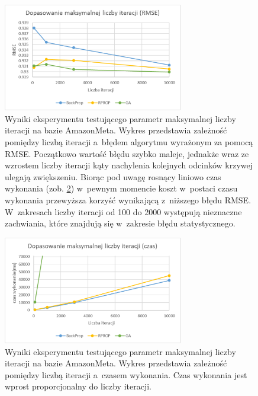 \documentclass[twoside]{iisthesis}
\begin{document}
			\begin{figure}[!ht]
				\centering
				\includegraphics[width=0.7\textwidth]{am_expiterations_rmse}		
				\caption{Wyniki eksperymentu testującego parametr maksymalnej liczby iteracji na bazie AmazonMeta. Wykres przedstawia zależność pomiędzy liczbą iteracji a~błędem algorytmu wyrażonym za pomocą RMSE. Początkowo wartość błędu szybko maleje, jednakże wraz ze wzrostem liczby iteracji kąty nachylenia kolejnych odcinków krzywej ulegają zwiększeniu. Biorąc pod uwagę rosnący liniowo czas wykonania (zob. \ref{fig:am_expiterations_time}) w~pewnym momencie koszt w~postaci czasu wykonania przewyższa korzyść wynikającą z~niższego błędu RMSE. W~zakresach liczby iteracji od 100 do 2000 występują nieznaczne zachwiania, które znajdują się w~zakresie błędu statystycznego. }
				\label{fig:am_expiterations_rmse}
			\end{figure}
			
			\begin{figure}[!ht]
				\centering
				\includegraphics[width=0.7\textwidth]{am_expiterations_time}			
				\caption{Wyniki eksperymentu testującego parametr maksymalnej liczby iteracji na bazie AmazonMeta. Wykres przedstawia zależność pomiędzy liczbą iteracji a~czasem wykonania. Czas wykonania jest wprost proporcjonalny do liczby iteracji. }
				\label{fig:am_expiterations_time}
			\end{figure}
		
\end{document}
